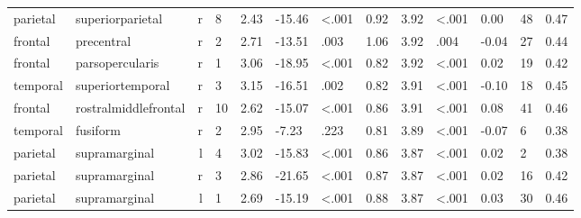 \documentclass{article}
\begin{document}
\begin{longtable}{llrR{1.3cm}R{1cm}R{1.3cm}R{1cm}R{1cm}R{1.3cm}R{1cm}R{1.8cm}R{1.3cm}R{1.8cm}}
  parietal &          superiorparietal &    r &         8 &                  2.43 &           -15.46 &      \textless.001 &                               0.92 &                          3.92 &                   \textless.001 &   0.00 &     48 &      0.47 \\
   frontal &                precentral &    r &         2 &                  2.71 &           -13.51 &               .003 &                               1.06 &                          3.92 &                            .004 &  -0.04 &     27 &      0.44 \\
   frontal &           parsopercularis &    r &         1 &                  3.06 &           -18.95 &      \textless.001 &                               0.82 &                          3.92 &                   \textless.001 &   0.02 &     19 &      0.42 \\
  temporal &          superiortemporal &    r &         3 &                  3.15 &           -16.51 &               .002 &                               0.82 &                          3.91 &                   \textless.001 &  -0.10 &     18 &      0.45 \\
   frontal &      rostralmiddlefrontal &    r &        10 &                  2.62 &           -15.07 &      \textless.001 &                               0.86 &                          3.91 &                   \textless.001 &   0.08 &     41 &      0.46 \\
  temporal &                  fusiform &    r &         2 &                  2.95 &            -7.23 &               .223 &                               0.81 &                          3.89 &                   \textless.001 &  -0.07 &      6 &      0.38 \\
  parietal &             supramarginal &    l &         4 &                  3.02 &           -15.83 &      \textless.001 &                               0.86 &                          3.87 &                   \textless.001 &   0.02 &      2 &      0.38 \\
  parietal &             supramarginal &    r &         3 &                  2.86 &           -21.65 &      \textless.001 &                               0.87 &                          3.87 &                   \textless.001 &   0.02 &     16 &      0.42 \\
  parietal &             supramarginal &    l &         1 &                  2.69 &           -15.19 &      \textless.001 &                               0.88 &                          3.87 &                   \textless.001 &   0.03 &     30 &      0.46 \\

\end{longtable}
\end{document}
